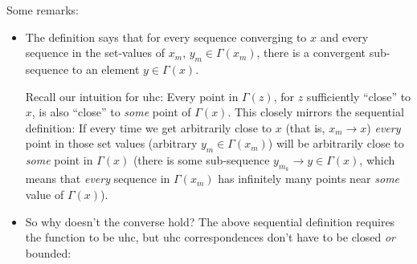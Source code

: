 \documentclass{article}
\theoremstyle{mythm}
\theoremstyle{mydef}
\begin{document}
Some remarks:
\begin{itemize}
  \item The definition says that for every sequence converging to $x$ and every sequence in the set-values of $x_m$, $y_m \in \Gamma(x_m)$, there is a convergent sub-sequence to an element $y \in \Gamma(x)$.

    Recall our intuition for uhc: Every point in $\Gamma(z)$, for $z$ sufficiently ``close'' to $x$, is also ``close'' to \textit{some} point of $\Gamma(x)$. This closely mirrors the sequential definition: If every time we get arbitrarily close to $x$ (that is, $x_m \to x$) \textit{every} point in those set values (arbitrary $y_m \in \Gamma(x_m)$) will be arbitrarily close to \textit{some} point in $\Gamma(x)$ (there is some sub-sequence $y_{m_k} \to y \in \Gamma(x)$, which means that \textit{every} sequence in $\Gamma(x_m)$ has infinitely many points near \textit{some} value of $\Gamma(x)$).

  \item So why doesn't the converse hold? The above sequential definition requires the function to be uhc, but uhc correspondences don't have to be closed \textit{or} bounded:
    \begin{figure}[H]
      \centering
      \caption{}
      \label{fig:}
    \end{figure}


\end{itemize}
\end{document}
